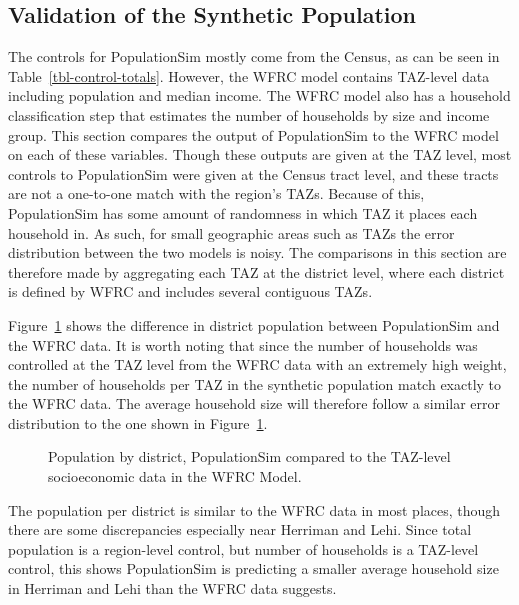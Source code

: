 \documentclass[fancy, twoside, mastersfancy, ms]{byuthesis}
\begin{document}
\subsection{Validation of the Synthetic
Population}\label{validation-of-the-synthetic-population}

The controls for PopulationSim mostly come from the Census, as can be
seen in Table~\ref{tbl-control-totals}. However, the WFRC model contains
TAZ-level data including population and median income. The WFRC model
also has a household classification step that estimates the number of
households by size and income group. This section compares the output of
PopulationSim to the WFRC model on each of these variables. Though these
outputs are given at the TAZ level, most controls to PopulationSim were
given at the Census tract level, and these tracts are not a one-to-one
match with the region's TAZs. Because of this, PopulationSim has some
amount of randomness in which TAZ it places each household in. As such,
for small geographic areas such as TAZs the error distribution between
the two models is noisy. The comparisons in this section are therefore
made by aggregating each TAZ at the district level, where each district
is defined by WFRC and includes several contiguous TAZs.

Figure~\ref{fig-population-comparison} shows the difference in district
population between PopulationSim and the WFRC data. It is worth noting
that since the number of households was controlled at the TAZ level from
the WFRC data with an extremely high weight, the number of households
per TAZ in the synthetic population match exactly to the WFRC data. The
average household size will therefore follow a similar error
distribution to the one shown in Figure~\ref{fig-population-comparison}.

\begin{figure}


\caption{\label{fig-population-comparison}Population by district,
PopulationSim compared to the TAZ-level socioeconomic data in the WFRC
Model.}

\end{figure}%

The population per district is similar to the WFRC data in most places,
though there are some discrepancies especially near Herriman and Lehi.
Since total population is a region-level control, but number of
households is a TAZ-level control, this shows PopulationSim is
predicting a smaller average household size in Herriman and Lehi than
the WFRC data suggests.
\end{document}
